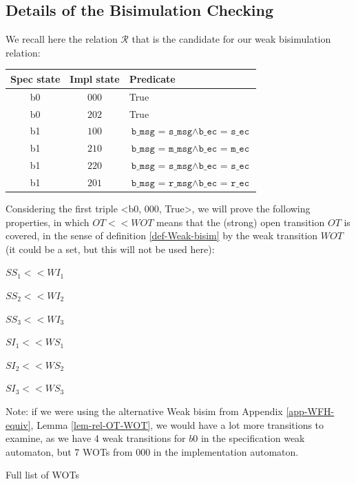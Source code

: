         \subsection{Details of the Bisimulation Checking}
         
We recall here the relation $\mathcal{R}$ that is the candidate for our weak bisimulation relation:

\bigskip
  \begin{tabular}{|c|c|l|}
\hline
    Spec state & Impl state & Predicate\\
    \hline
    b0 & $000$ & True\\
    b0 & $202$ & True\\
    b1 & $100$ & $\texttt{b\_msg = s\_msg} \land \texttt{b\_ec = s\_ec}$\\
    b1 & $210$ & $\texttt{b\_msg = m\_msg} \land \texttt{b\_ec = m\_ec}$\\
    b1 & $220$ & $\texttt{b\_msg = s\_msg} \land \texttt{b\_ec = s\_ec}$\\
    b1 & $201$ & $\texttt{b\_msg = r\_msg} \land \texttt{b\_ec = r\_ec}$\\
    \hline
    \end{tabular}


\bigskip
Considering the first triple <b0, 000, True>, we will prove the following properties, in which $OT<<WOT$ means that the (strong) open transition $OT$ is covered, in the sense of definition \ref{def-Weak-bisim} by the weak transition $WOT$ (it could be a set, but this will not be used here):

\bigskip
$SS_1 << WI_1$

$SS_2 << WI_2$

$SS_3 << WI_3$

\smallskip
$SI_1 << WS_1$

$SI_2 << WS_2$

$SI_3 << WS_3$
         
         Note: if we were using the alternative Weak bisim from Appendix \ref{app-WFH-equiv}, Lemma \ref{lem-rel-OT-WOT}, we would have a lot more transitions to examine, as we  have 4 weak transitions for $b0$ in the specification weak automaton, but 7 WOTs from 000 in the implementation automaton.
         
       Full list of WOTs


         


